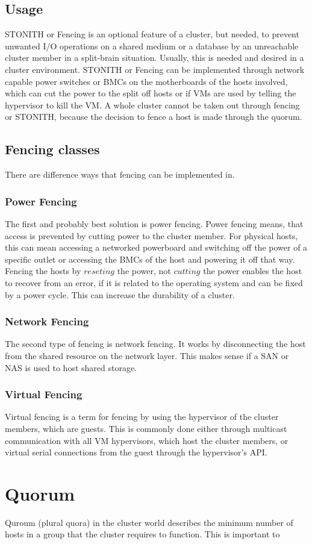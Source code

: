 \subsection{Usage}
STONITH or Fencing is an optional feature of a cluster, but needed,
to prevent unwanted I/O operations on a shared medium or a database
by an unreachable cluster member in a split-brain situation. Usually, this is needed
and desired in a cluster environment. STONITH or Fencing can be implemented
through network capable power switches or \acp{BMC} on the motherboards
of the hosts involved, which can cut the power to the split off hosts or
if \acp{VM} are used by telling the hypervisor to kill the \ac{VM}.
A whole cluster cannot be taken out through fencing or \ac{STONITH}, because
the decision to fence a host is made through the quorum.
\subsection{Fencing classes}
There are difference ways that fencing can be implemented in.
\subsubsection{Power Fencing}
The first and probably best solution is power fencing.
Power fencing means, that access is prevented by cutting power to the cluster member.
For physical hosts, this can mean accessing a networked powerboard and switching
off the power of a specific outlet or accessing the \acp{BMC} of the host
and powering it off that way. Fencing the hosts by $reseting$ the power, not $cutting$
the power enables the host to recover from an error, if it is related to the operating
system and can be fixed by a power cycle. This can increase the durability of a cluster.
\subsubsection{Network Fencing}
The second type of fencing is network fencing. It works by disconnecting the host
from the shared resource on the network layer. This makes sense if a \ac{SAN} or \ac{NAS}
is used to host shared storage.
\subsubsection{Virtual Fencing}
Virtual fencing is a term for fencing by using the hypervisor of the cluster members,
which are guests. This is commonly done either through multicast communication with all
\ac{VM} hypervisors, which host the cluster members, or virtual serial connections
from the guest through the hypervisor's \ac{API}.


\section{Quorum}
Quroum (plural quora) in the cluster world describes the minimum number
of hosts in a group that the cluster requires to function. This is important to 
